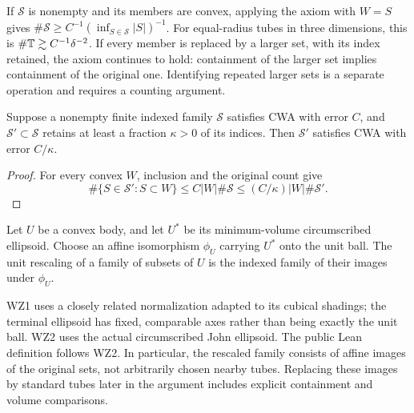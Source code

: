 \begin{remark}
\label{rem:cwa-consequences}
If $\mathcal S$ is nonempty and its members are convex, applying the
axiom with $W=S$ gives
$\#\mathcal S\geq C^{-1}(\inf_{S\in\mathcal S}|S|)^{-1}$.
For equal-radius tubes in three dimensions, this is
$\#\mathbb{T}\gtrsim C^{-1}\delta^{-2}$.
If every member is replaced by a larger set, with its index retained,
the axiom continues to hold: containment of the larger set implies
containment of the original one. Identifying repeated larger sets is
a separate operation and requires a counting argument.
\end{remark}

\begin{lemma}
\label{lem:cwa-refinement}
Suppose a nonempty finite indexed family $\mathcal S$ satisfies CWA
with error $C$, and $\mathcal S'\subset\mathcal S$ retains at least
a fraction $\kappa>0$ of its indices. Then $\mathcal S'$ satisfies
CWA with error $C/\kappa$.
\end{lemma}
\begin{proof}
For every convex $W$, inclusion and the original count give
\[
 \#\{S\in\mathcal S':S\subset W\}
 \leq C|W|\#\mathcal S
 \leq(C/\kappa)|W|\#\mathcal S'.
\]
\end{proof}

\begin{definition}
\label{def:unit-rescaling}
\leanok
Let $U$ be a convex body, and let $U^*$ be its minimum-volume
circumscribed ellipsoid. Choose an affine isomorphism $\phi_U$ carrying
$U^*$ onto the unit ball. The unit rescaling of a family of subsets of
$U$ is the indexed family of their images under $\phi_U$.
\end{definition}

\begin{remark}
\label{rem:john-normalization}
WZ1 uses a closely related normalization adapted to its cubical
shadings; the terminal ellipsoid has fixed, comparable axes rather
than being exactly the unit ball. WZ2 uses the actual circumscribed
John ellipsoid. The public Lean definition follows WZ2. In particular,
the rescaled family consists of affine images of the original sets,
not arbitrarily chosen nearby tubes. Replacing these images by
standard tubes later in the argument includes explicit containment
and volume comparisons.
\end{remark}

